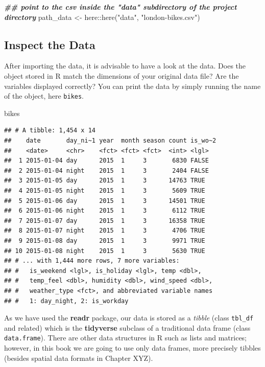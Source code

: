 \documentclass[
]{krantz}
\makeatletter
\newenvironment{Shaded}{\begin{snugshade}}{\end{snugshade}}
\newcommand{\DocumentationTok}[1]{\textcolor[rgb]{0.37,0.37,0.37}{\textbf{\textit{#1}}}}
\newcommand{\FunctionTok}[1]{\textcolor[rgb]{0,0,0}{#1}}
\newcommand{\NormalTok}[1]{#1}
\newcommand{\OtherTok}[1]{\textcolor[rgb]{0.37,0.37,0.37}{#1}}
\newcommand{\SpecialCharTok}[1]{\textcolor[rgb]{0,0,0}{#1}}
\newcommand{\StringTok}[1]{\textcolor[rgb]{0.5,0.5,0.5}{#1}}
\newenvironment{kframe}{%
\medskip{}
\setlength{\fboxsep}{.8em}
 \def\at@end@of@kframe{}%
 \ifinner\ifhmode%
  \def\at@end@of@kframe{\end{minipage}}%
  \begin{minipage}{\columnwidth}%
 \fi\fi%
 \def\FrameCommand##1{\hskip\@totalleftmargin \hskip-\fboxsep
 \colorbox{shadecolor}{##1}\hskip-\fboxsep
     \hskip-\linewidth \hskip-\@totalleftmargin \hskip\columnwidth}%
 \MakeFramed {\advance\hsize-\width
   \@totalleftmargin\z@ \linewidth\hsize
   \@setminipage}}%
 {\par\unskip\endMakeFramed%
 \at@end@of@kframe}
\renewenvironment{Shaded}{\begin{kframe}}{\end{kframe}}
\makeatother
\begin{document}
\begin{Shaded}
\begin{Highlighting}[]
\DocumentationTok{\#\# point to the csv inside the "data" subdirectory of the project directory}
\NormalTok{path\_data }\OtherTok{\textless{}{-}}\NormalTok{ here}\SpecialCharTok{::}\FunctionTok{here}\NormalTok{(}\StringTok{"data"}\NormalTok{, }\StringTok{"london{-}bikes.csv"}\NormalTok{) }
\end{Highlighting}
\end{Shaded}

\hypertarget{inspect}{%
\subsection{Inspect the Data}\label{inspect}}

After importing the data, it is advisable to have a look at the data. Does the object stored in R match the dimensions of your original data file? Are the variables displayed correctly? You can print the data by simply running the name of the object, here \texttt{bikes}.

\begin{Shaded}
\begin{Highlighting}[]
\NormalTok{bikes}
\end{Highlighting}
\end{Shaded}

\begin{verbatim}
## # A tibble: 1,454 x 14
##    date       day_ni~1 year  month season count is_wo~2
##    <date>     <chr>    <fct> <fct> <fct>  <int> <lgl>  
##  1 2015-01-04 day      2015  1     3       6830 FALSE  
##  2 2015-01-04 night    2015  1     3       2404 FALSE  
##  3 2015-01-05 day      2015  1     3      14763 TRUE   
##  4 2015-01-05 night    2015  1     3       5609 TRUE   
##  5 2015-01-06 day      2015  1     3      14501 TRUE   
##  6 2015-01-06 night    2015  1     3       6112 TRUE   
##  7 2015-01-07 day      2015  1     3      16358 TRUE   
##  8 2015-01-07 night    2015  1     3       4706 TRUE   
##  9 2015-01-08 day      2015  1     3       9971 TRUE   
## 10 2015-01-08 night    2015  1     3       5630 TRUE   
## # ... with 1,444 more rows, 7 more variables:
## #   is_weekend <lgl>, is_holiday <lgl>, temp <dbl>,
## #   temp_feel <dbl>, humidity <dbl>, wind_speed <dbl>,
## #   weather_type <fct>, and abbreviated variable names
## #   1: day_night, 2: is_workday
\end{verbatim}

As we have used the \textbf{readr} package, our data is stored as a \emph{tibble} (class \texttt{tbl\_df} and related) which is the \textbf{tidyverse} subclass of a traditional data frame (class \texttt{data.frame}). There are other data structures in R such as lists and matrices; however, in this book we are going to use only data frames, more precisely tibbles (besides spatial data formats in Chapter XYZ).
\end{document}

